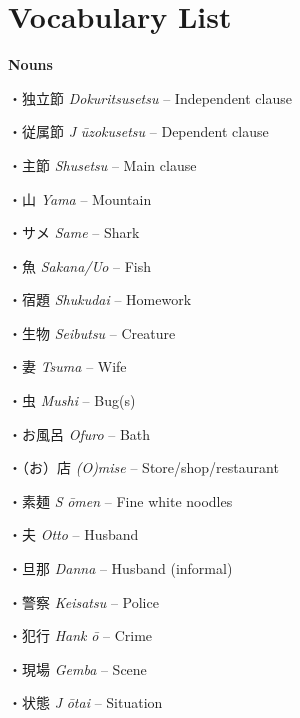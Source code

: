 \section{Vocabulary List}
 
\par{\textbf{Nouns }}

\par{・独立節 \emph{Dokuritsusetsu }– Independent clause }

\par{・従属節 \emph{J }\emph{ūzokusetsu }– Dependent clause }

\par{・主節 \emph{Shusetsu }– Main clause }

\par{・山 \emph{Yama }– Mountain }

\par{・サメ \emph{Same }– Shark }

\par{・魚 \emph{Sakana\slash Uo }– Fish }

\par{・宿題 \emph{Shukudai }– Homework }

\par{・生物 \emph{Seibutsu }– Creature }

\par{・妻 \emph{Tsuma }– Wife }

\par{・虫 \emph{Mushi }– Bug(s) }

\par{・お風呂 \emph{Ofuro }– Bath }

\par{・（お）店 \emph{(O)mise }– Store\slash shop\slash restaurant }

\par{・素麺 \emph{S }\emph{ōmen }– Fine white noodles }

\par{・夫 \emph{Otto }– Husband }

\par{・旦那 \emph{Dan\textquotesingle na }– Husband (informal) }

\par{・警察 \emph{Keisatsu }– Police }

\par{・犯行 \emph{Hank }\emph{ō }– Crime }

\par{・現場 \emph{Gemba }– Scene }

\par{・状態 \emph{J }\emph{ōtai }– Situation }

